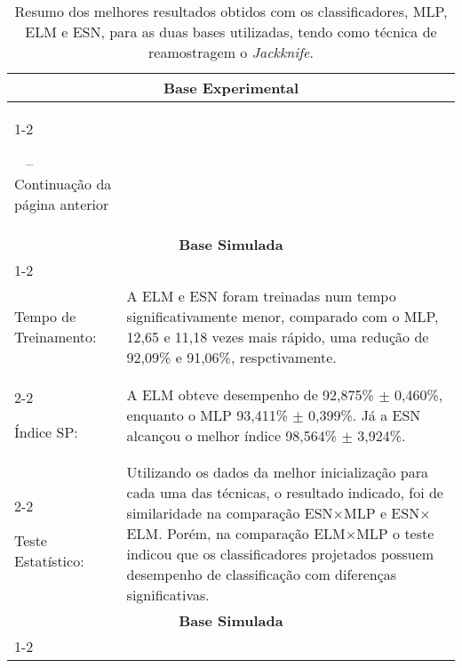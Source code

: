 \begin{center}
	\begin{small}
	\setlength{\extrarowheight}{5pt}       %
	\begin{longtable}[H]{p{3.8cm}p{11cm}}
		\caption{Resumo dos melhores resultados obtidos com os classificadores, MLP, ELM e ESN, para as duas bases utilizadas, tendo como técnica de reamostragem o \textit{Jackknife}.} \label{tab:resumo} \\
		
		\toprule \multicolumn{2}{c}{\textbf{Base Experimental}} \\ \cmidrule(lr){1-2} %
		\endfirsthead
				
		\multicolumn{2}{c}%
		{{ \footnotesize{\tablename\ \thetable{} -- Continuação da página anterior}}} \\
		\toprule \multicolumn{2}{c}{\textbf{Base Simulada}} \\ \cmidrule(lr){1-2} %
		\endhead
		
		\multicolumn{2}{r}{\footnotesize{Continua na próxima página}} \\ 
		\endfoot		
		
		\endlastfoot
		
Tempo de Treinamento: & A ELM e ESN foram treinadas num tempo significativamente menor, comparado com o MLP, 12,65 e 11,18 vezes mais rápido, uma redução de 92,09\% e 91,06\%, respctivamente. \\ \cmidrule(lr){2-2}

Índice SP:            & A ELM obteve desempenho de 92,875\% $\pm$ 0,460\%, enquanto o MLP 93,411\% $\pm$ 0,399\%. Já a ESN alcançou o melhor índice 98,564\% $\pm$ 3,924\%. \\ \cmidrule(lr){2-2}

Teste Estatístico:    & Utilizando os dados da melhor inicialização para cada uma das técnicas, o resultado indicado, foi de similaridade na comparação ESN$\times$MLP e ESN$\times$ELM. Porém, na comparação ELM$\times$MLP o teste indicou que os classificadores projetados possuem desempenho de classificação com diferenças significativas.\\ \midrule \midrule

		\multicolumn{2}{c}{\textbf{Base Simulada}}\\ \cmidrule(lr){1-2}
		

\end{longtable}
\end{small}
\end{center}
